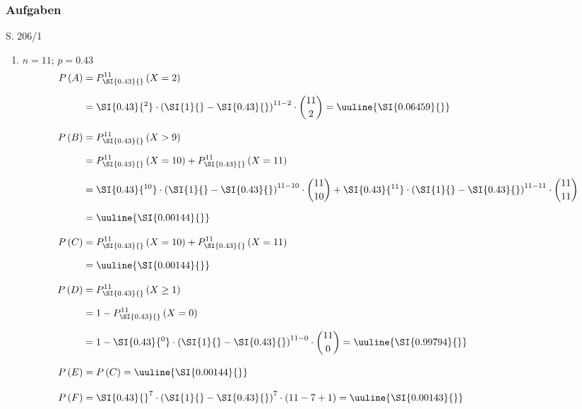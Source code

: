 
\subsubsection{Aufgaben}

\begin{Exercise}{S. 206/1}{}
\begin{enumerate}[leftmargin=*]
    \item [1.]{
        $n = 11$; \quad $p = \SI{0.43}{}$\\[1.0ex]
        \begin{align*}
            P\left(A\right) &= P_{\SI{0.43}{}}^{11}\left(X = 2\right)\\[1.5ex]
            &= \SI{0.43}{^2} \cdot \left(\SI{1}{} - \SI{0.43}{}\right)^{11-2} \cdot \binom{11}{2} = \uuline{\SI{0.06459}{}}\\[2.0ex]
            P\left(B\right) &= P_{\SI{0.43}{}}^{11}\left(X > 9\right)\\[1.5ex]
            &= P_{\SI{0.43}{}}^{11}\left(X = 10\right) + P_{\SI{0.43}{}}^{11}\left(X = 11\right)\\[1.5ex]
            &= \SI{0.43}{^{10}} \cdot \left(\SI{1}{} - \SI{0.43}{}\right)^{11-10} \cdot \binom{11}{10} + \SI{0.43}{^{11}} \cdot \left(\SI{1}{} - \SI{0.43}{}\right)^{11-11} \cdot \binom{11}{11}\\[1.5ex]
            &= \uuline{\SI{0.00144}{}}\\[2.0ex]
            P\left(C\right) &= P_{\SI{0.43}{}}^{11}\left(X = 10\right) + P_{\SI{0.43}{}}^{11}\left(X = 11\right)\\[1.5ex]
            &= \uuline{\SI{0.00144}{}}\\[2.0ex]
            P\left(D\right) &= P_{\SI{0.43}{}}^{11}\left(X \geq 1\right)\\[1.5ex]
            &= 1 - P_{\SI{0.43}{}}^{11}\left(X = 0\right)\\[1.5ex]
            &= 1 - \SI{0.43}{^0} \cdot \left(\SI{1}{} - \SI{0.43}{}\right)^{11-0} \cdot \binom{11}{0} = \uuline{\SI{0.99794}{}}\\[2.0ex]
            P\left(E\right) &= P\left(C\right) = \uuline{\SI{0.00144}{}}\\[2.0ex]
            P\left(F\right) &= \SI{0.43}{}^{7} \cdot \left(\SI{1}{} - \SI{0.43}{}\right)^{7} \cdot \left(11 - 7 + 1 \right) = \uuline{\SI{0.00143}{}}
        \end{align*}
    }
\end{enumerate}
\end{Exercise}
\pagebreak

